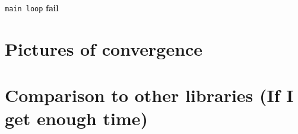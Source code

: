 \documentclass{article} %
\begin{document}
\begin{algorithm}
\begin{algorithmic}[1]
			\EndIf
		\Else
			\State \Goto \texttt{main loop}
		\EndIf
	\Else
			\textbf{fail}
		\EndIf
	\EndIf
\EndWhile
\EndProcedure
\end{algorithmic}
\end{algorithm}

\FloatBarrier



\section{Pictures of convergence}
\section{Comparison to other libraries (If I get enough time)}




\newpage

 

\end{document}
